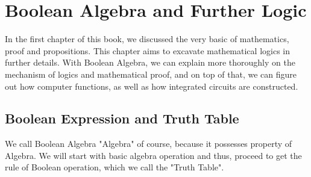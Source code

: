 \chapterspaceabove{6.75cm} 
\chapterspacebelow{7.25cm} 
\chapter{Boolean Algebra and Further Logic}
    In the first chapter of this book, we discussed the very basic of mathematics, 
    proof and propositions. This chapter aims to excavate mathematical logics in 
    further details. With Boolean Algebra, we can explain more thoroughly on
    the mechanism of logics and mathematical proof, and on top of that, we can 
    figure out how computer functions, as well as how integrated circuits are 
    constructed.
    \section{Boolean Expression and Truth Table}
        We call Boolean Algebra "Algebra" of course, because it possesses property of Algebra.
        We will start with basic algebra operation and thus, proceed to get the rule of 
        Boolean operation, which we call the "Truth Table".
